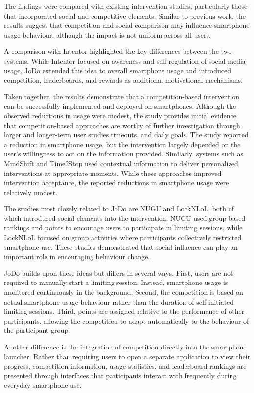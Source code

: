 \documentclass[11pt]{report}
\begin{document}
The findings were compared with existing intervention studies, particularly those that incorporated social and competitive elements. Similar to previous work, the results suggest that competition and social comparison may influence smartphone usage behaviour, although the impact is not uniform across all users.

A comparison with Intentor highlighted the key differences between the two systems. While Intentor focused on awareness and self-regulation of social media usage, JoDo extended this idea to overall smartphone usage and introduced competition, leaderboards, and rewards as additional motivational mechanisms.

Taken together, the results demonstrate that a competition-based intervention can be successfully implemented and deployed on smartphones. Although the observed reductions in usage were modest, the study provides initial evidence that competition-based approaches are worthy of further investigation through larger and longer-term user studies.timeouts, and daily goals. 
The study reported a reduction in smartphone usage, but the intervention largely depended 
on the user's willingness to act on the information provided. Similarly, systems such as 
MindShift and Time2Stop used contextual information to deliver personalized interventions 
at appropriate moments. While these approaches improved intervention acceptance, the 
reported reductions in smartphone usage were relatively modest.

The studies most closely related to JoDo are NUGU and LockNLoL, both of which introduced 
social elements into the intervention. NUGU used group-based rankings and points to 
encourage users to participate in limiting sessions, while LockNLoL focused on group 
activities where participants collectively restricted smartphone use. These studies 
demonstrated that social influence can play an important role in encouraging behaviour 
change.

JoDo builds upon these ideas but differs in several ways. First, users are not required 
to manually start a limiting session. Instead, smartphone usage is monitored continuously 
in the background. Second, the competition is based on actual smartphone usage behaviour 
rather than the duration of self-initiated limiting sessions. Third, points are assigned 
relative to the performance of other participants, allowing the competition to adapt 
automatically to the behaviour of the participant group.

Another difference is the integration of competition directly into the smartphone launcher. 
Rather than requiring users to open a separate application to view their progress, 
competition information, usage statistics, and leaderboard rankings are presented 
through interfaces that participants interact with frequently during everyday 
smartphone use.
\end{document}
